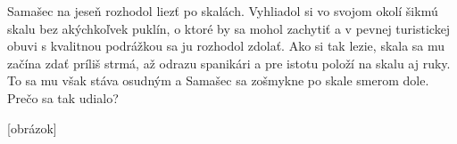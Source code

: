 Samašec na jeseň rozhodol liezť po skalách. Vyhliadol si vo svojom okolí
šikmú skalu bez akýchkoľvek puklín, o ktoré by sa mohol zachytiť a v
pevnej turistickej obuvi s kvalitnou podrážkou sa ju rozhodol zdolať.
Ako si tak lezie, skala sa mu začína zdať príliš strmá, až odrazu
spanikári a pre istotu položí na skalu aj ruky. To sa mu však stáva
osudným a Samašec sa zošmykne po skale smerom dole. Prečo sa tak udialo?

{[}obrázok{]}
